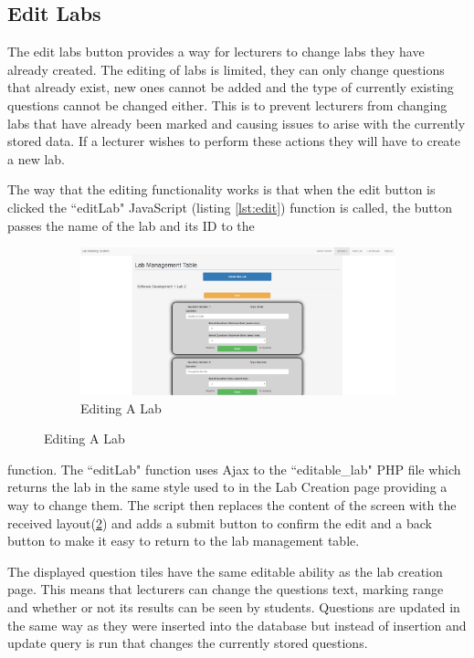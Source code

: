 \documentclass[11pt]{report}
\begin{document}
\subsection{Edit Labs}
The edit labs button provides a way for lecturers to change labs they have already created. The editing of labs is limited, they can only change questions that already exist, new ones cannot be added and the type of currently existing questions cannot be changed either. This is to prevent lecturers from changing labs that have already been marked and causing issues to arise with the currently stored data. If a lecturer wishes to perform these actions they will have to create a new lab.



\noindent The way that the editing functionality works is that when  the edit button is clicked the ``editLab" JavaScript (listing \ref{lst:edit}) function is called, the button passes the name of the lab and its ID to the

\begin{figure}
\vspace*{-\baselineskip}
\begin{figure}[H]
    \centering
    \includegraphics[width=1\textwidth]{images/implementation/edit-lab-page.png}
    \caption{Editing A Lab}
    \label{fig:edit-lab}
\end{figure}
\end{figure}

\noindent function. The ``editLab" function uses Ajax to the ``editable\_lab" PHP file which returns the lab in the same style used to in the Lab Creation page providing a way to change them. The script then replaces the content of the screen with the received layout(\ref{fig:edit-lab}) and adds a submit button to confirm the edit and a back button to make it easy to return to the lab management table.

\noindent The displayed question tiles have the same editable ability as the lab creation page. This means that lecturers can change the questions text, marking range and whether or not its results can be seen by students. Questions are updated in the same way as they were inserted into the database but instead of insertion and update query is run that changes the currently stored questions.
\end{document}
